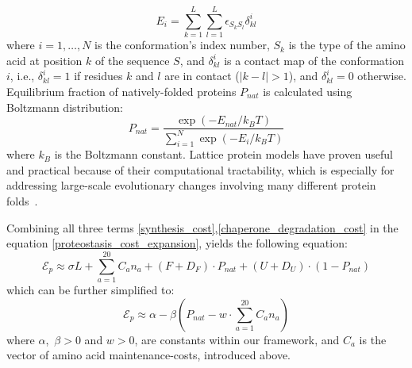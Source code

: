 \documentclass[10pt,letterpaper]{article}
\begin{document}
\begin{equation}
	\label{protein_globule_energy}
	E_{i} = \sum\limits_{k=1}^{L}\sum\limits_{l=1}^{L}\epsilon_{S_{k}S_{l}}\delta^{i}_{kl}
\end{equation}
where $i=1,\dots,N$ is the conformation's index number, $S_{k}$ is the type of the amino acid at position $k$ of the sequence $S$, and $\delta^{i}_{kl}$ is a contact map of the conformation $i$, i.e., $\delta^{i}_{kl}=1$ if residues $k$ and $l$ are in contact ($|k-l|>1$), and $\delta^{i}_{kl}=0$ otherwise. Equilibrium fraction of natively-folded proteins $P_{nat}$ is calculated using Boltzmann distribution:
\begin{equation}
	\label{pnat_boltzmann}
	P_{nat} = \frac{\exp\left(-E_{nat}/k_{B}T\right)}{\sum\limits_{i=1}^{N}\exp\left(-E_{i}/k_{B}T\right)}
\end{equation}
where $k_{B}$ is the Boltzmann constant. Lattice protein models have proven useful and practical because of their computational tractability, which is especially for addressing large-scale evolutionary changes involving many different protein folds~\cite{Sikosek2014Biophysics}.


Combining all three terms \eqref{synthesis_cost},\eqref{chaperone_degradation_cost} in the equation \eqref{proteostasis_cost_expansion}, yields the following equation:
\begin{equation}
	\label{proteostasis_cost_detailed}
	\mathcal{E}_{p} \approx \sigma L + \sum\limits_{a=1}^{20}C_{a}n_{a} + (F+D_{F})\cdot P_{nat} + (U+D_{U})\cdot\left(1-P_{nat}\right)
\end{equation}
which can be further simplified to:
\begin{equation}
	\label{proteostasis_cost_simplified}
	\mathcal{E}_{p} \approx \alpha - \beta\left(P_{nat} - \mathit{w}\cdot\sum\limits_{a=1}^{20}C_{a}n_{a} \right)
\end{equation}
where $\alpha$,\, $\beta > 0$ and $\mathit{w}>0$, are constants within our framework, and $C_{a}$ is the vector of amino acid maintenance-costs, introduced above. 
\end{document}
